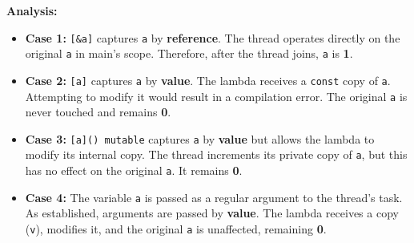 \documentclass{article} %
\begin{document}
\textbf{Analysis:}
\begin{itemize}
    \item \textbf{Case 1:} \texttt{[\&a]} captures \texttt{a} by \textbf{reference}. The thread operates directly on the original \texttt{a} in main's scope. Therefore, after the thread joins, \texttt{a} is \textbf{1}.
    \item \textbf{Case 2:} \texttt{[a]} captures \texttt{a} by \textbf{value}. The lambda receives a \texttt{const} copy of \texttt{a}. Attempting to modify it would result in a compilation error. The original \texttt{a} is never touched and remains \textbf{0}.
    \item \textbf{Case 3:} \texttt{[a]() mutable} captures \texttt{a} by \textbf{value} but allows the lambda to modify its internal copy. The thread increments its private copy of \texttt{a}, but this has no effect on the original \texttt{a}. It remains \textbf{0}.
    \item \textbf{Case 4:} The variable \texttt{a} is passed as a regular argument to the thread's task. As established, arguments are passed by \textbf{value}. The lambda receives a copy (\texttt{v}), modifies it, and the original \texttt{a} is unaffected, remaining \textbf{0}.
\end{itemize}
\end{document}
